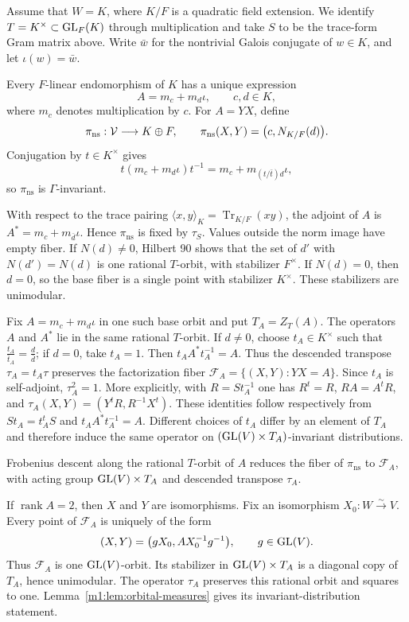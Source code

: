 Assume that $W=K$, where $K/F$ is a quadratic field extension. We identify \(T=K^\times\subset
\operatorname{GL}_F(K)\) through multiplication and take $S$ to be the trace-form Gram matrix above.
Write $\bar w$ for the nontrivial
Galois conjugate of $w\in K$, and let $\iota(w)=\bar w$.

Every $F$-linear endomorphism of $K$ has a unique expression
\[
    A=m_c+m_d\iota,
    \qquad c,d\in K,
\]
where $m_c$ denotes multiplication by $c$.  For $A=YX$, define
\[
    \pi_{\mathrm{ns}}:\mathcal V\longrightarrow K\oplus F,
    \qquad
    \pi_{\mathrm{ns}}(X,Y)=\bigl(c,N_{K/F}(d)\bigr).
\]
Conjugation by $t\in K^\times$ gives
\[
    t(m_c+m_d\iota)t^{-1}
    =m_c+m_{(t/\bar t)d}\iota,
\]
so $\pi_{\mathrm{ns}}$ is $\Gamma$-invariant.

With respect to the trace pairing \(\langle x,y\rangle_K=\operatorname{Tr}_{K/F}(xy)\), the adjoint of
$A$ is \(A^\ast=m_c+m_{\bar d}\iota\). Hence $\pi_{\mathrm{ns}}$ is fixed by $\tau_S$. Values outside the
norm image have empty fiber. If $N(d)\neq0$, Hilbert 90
shows that the set of $d'$ with $N(d')=N(d)$ is one rational $T$-orbit, with
stabilizer $F^\times$.  If $N(d)=0$, then $d=0$, so the base fiber is a single
point with stabilizer $K^\times$.  These stabilizers are unimodular.

Fix $A=m_c+m_d\iota$ in one such base orbit and put \(T_A=Z_T(A)\). The operators $A$ and $A^\ast$ lie in
the same rational $T$-orbit.  If
$d\neq0$, choose $t_A\in K^\times$ such that \(\frac{t_A}{\bar t_A}=\frac{d}{\bar d}\); if $d=0$, take
$t_A=1$.  Then \(t_AA^\ast t_A^{-1}=A\). Thus the descended transpose \(\tau_A=t_A\tau\) preserves the
factorization fiber \(\mathcal F_A=\{(X,Y):YX=A\}\). Since $t_A$ is self-adjoint, $\tau_A^2=1$. More
explicitly, with \(R=S t_A^{-1}\) one has $R^t=R$, $RA=A^tR$, and
$\tau_A(X,Y)=(Y^tR,R^{-1}X^t)$. These identities follow respectively
from $St_A=t_A^tS$ and $t_AA^*t_A^{-1}=A$.
Different choices of $t_A$ differ by an element of $T_A$ and therefore induce
the same operator on $(\operatorname{GL}(V)\times T_A)$-invariant distributions.

Frobenius descent along the rational $T$-orbit of $A$ reduces the
fiber of $\pi_{\mathrm{ns}}$ to $\mathcal F_A$, with acting group
$\operatorname{GL}(V)\times T_A$ and descended transpose $\tau_A$.

If $\operatorname{rank}A=2$, then $X$ and $Y$ are isomorphisms.  Fix an
isomorphism $X_0:W\xrightarrow{\sim}V$.  Every point of $\mathcal F_A$ is
uniquely of the form
\[
    (X,Y)=\bigl(gX_0,AX_0^{-1}g^{-1}\bigr),
    \qquad g\in\operatorname{GL}(V).
\]
Thus $\mathcal F_A$ is one $\operatorname{GL}(V)$-orbit.  Its stabilizer in
$\operatorname{GL}(V)\times T_A$ is a diagonal copy of $T_A$, hence unimodular.  The operator $\tau_A$ preserves this rational orbit and squares to one.
Lemma~\ref{m1:lem:orbital-measures} gives its invariant-distribution statement.

